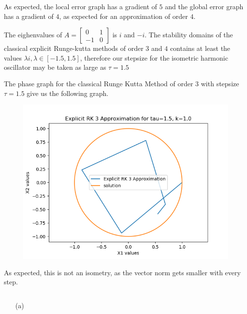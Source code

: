 \documentclass{article}
\theoremstyle{definition}
\begin{document}
\begin{itemize}
		As expected, the local error graph has a gradient of $5$ and the
		global error graph has a gradient of $4$, as expected for an
		approximation of order $4$.

		The eighenvalues of $A=\begin{bmatrix}0 & 1 \\ -1 &
		0\end{bmatrix}$ is $i$ and $-i$. The stability domains of the
		classical explicit Runge-kutta methods of order $3$ and $4$
		contains at least the values $\lambda i, \lambda \in [-1.5,
		1.5]$, therefore our stepsize for the isometric harmonic
		oscillator may be taken as large as $\tau = 1.5$

		The phase graph for the classical Runge Kutta Method of order
		$3$ with stepsize $\tau = 1.5$ give us the following graph.
		\begin{figure}[H]
			\includegraphics[scale=0.6]{harmonic_phase_erk3_15}
		\end{figure}
		As expected, this is not an isometry, as the vector norm gets
		smaller with every step.
\end{itemize}


\subsection{}
\begin{itemize}
	\item[(a)]
\end{itemize}
\end{document}
